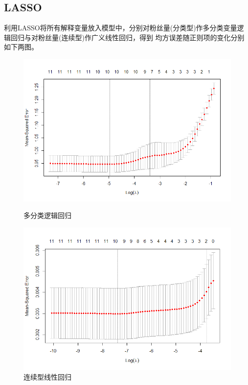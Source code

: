 \documentclass{ctexart}
\begin{document}
\subsection{LASSO}
利用LASSO将所有解释变量放入模型中，分别对粉丝量(分类型)作多分类变量逻辑回归与对粉丝量(连续型)作广义线性回归，得到
均方误差随正则项的变化分别如下两图。
\begin{figure}[H]
    \begin{minipage}[t]{0.48\textwidth}
        \centering
        \includegraphics[width=\textwidth]{EDA/lasso_multinomial.png}
        \caption{多分类逻辑回归}
    \end{minipage}
    \begin{minipage}[t]{0.48\textwidth}
        \centering
        \includegraphics[width=\textwidth]{EDA/lasso_continuous.png}
        \caption{连续型线性回归}
    \end{minipage}
\end{figure}
\end{document}
